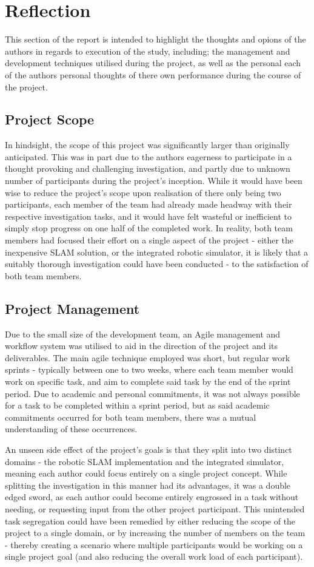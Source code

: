 \section{Reflection}
This section of the report is intended to highlight the thoughts and opions of
the authors in regards to execution of the study, including; the management
and development techniques utilised during the project, as well as the personal
each of the authors personal thoughts of there own performance during the
course of the project.


\subsection{Project Scope}
In hindsight, the scope of this project was significantly larger than originally
anticipated.
This was in part due to the authors eagerness to participate in a thought
provoking and challenging investigation, and partly due to unknown number of
participants during the project's inception.
While it would have been wise to reduce the project's scope upon realisation
of there only being two participants, each member of the team had already made
headway with their respective investigation tasks, and it would have felt
wasteful or inefficient to simply stop progress on one half of the completed
work.
In reality, both team members had focused their effort on a single aspect of
the project - either the inexpensive SLAM solution, or the integrated robotic
simulator, it is likely that a suitably thorough investigation could have been
conducted - to the satisfaction of both team members.


\subsection{Project Management}
Due to the small size of the development team, an Agile management and
workflow system was utilised to aid in the direction of the project and its
deliverables.
The main agile technique employed was short, but regular work sprints - 
typically between one to two weeks, where each team member would work on
specific task, and aim to complete said task by the end of the sprint period.
Due to academic and personal commitments, it was not always possible for a task
to be completed within a sprint period, but as said academic commitments
occurred for both team members, there was a mutual understanding of these
occurrences.

An unseen side effect of the project's goals is that they split into two
distinct domains - the robotic SLAM implementation and the integrated
simulator, meaning each author could focus entirely on a single project
concept.
While splitting the investigation in this manner had its advantages, it was a
double edged sword, as each author could become entirely engrossed in a task
without needing, or requesting input from the other project participant.
This unintended task segregation could have been remedied by either reducing the
scope of the project to a single domain, or by increasing the number of
members on the team - thereby creating a scenario where multiple participants
would be working on a single project goal (and also reducing the overall work
load of each participant).

